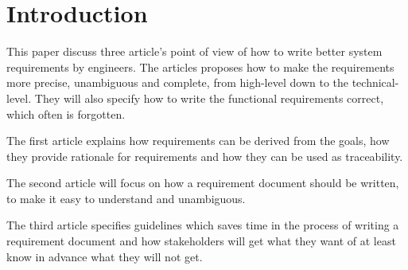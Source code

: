 \documentclass[Main]{subfiles}
\begin{document}
\section{Introduction}
This paper discuss three article's point of view of how to write better system requirements by engineers.
The articles proposes how to make the requirements more precise, unambiguous and complete\cite{Specifying}, from high-level down to the technical-level\cite{Goal}. 
They will also specify how to write the functional requirements correct, which often is forgotten\cite{Task}.

The first article explains how requirements can be derived from the goals, how they provide rationale for requirements and how they can be used as traceability.

The second article will focus on how a requirement document should be written, to make it easy to understand and unambiguous.

The third article specifies guidelines which saves time in the process of writing a requirement document and  how stakeholders will get what they want of at least know in advance what they will not get.
\end{document}
